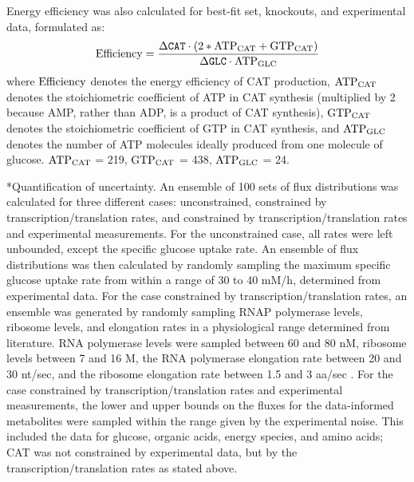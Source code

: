 \documentclass[12pt]{article}
\makeatletter
\renewcommand\subsubsection{\@startsection
	{subsubsection}{2}{0mm}
	{-0.05in}
	{-0.5\baselineskip}
	{\normalfont\normalsize\itshape}}
\makeatother
\begin{document}
Energy efficiency was also calculated for best-fit set, knockouts, and experimental data, formulated as:
\begin{equation}\label{eqn:energy-efficiency-definition}
	\rm Efficiency=\frac{\Delta\texttt{CAT}\cdot \left(2*\rm {ATP}_{CAT}+\rm {GTP}_{CAT}\right)}{\Delta\texttt{GLC}\cdot \rm {ATP}_{GLC}}
\end{equation}
where $\rm Efficiency$ denotes the energy efficiency of CAT production, $\rm {ATP}_{CAT}$ denotes the stoichiometric coefficient of ATP in CAT synthesis (multiplied by 2 because AMP, rather than ADP, is a product of CAT synthesis), $\rm {GTP}_{CAT}$ denotes the stoichiometric coefficient of GTP in CAT synthesis, and $\rm {ATP}_{GLC}$ denotes the number of ATP molecules ideally produced from one molecule of glucose.
$\rm {ATP}_{CAT}$ = 219, $\rm {GTP}_{CAT}$ = 438, $\rm {ATP}_{GLC}$ = 24.

\subsubsection*{Quantification of uncertainty.}
An ensemble of 100 sets of flux distributions was calculated for three different cases: unconstrained, constrained by transcription/translation rates, and constrained by transcription/translation rates and experimental measurements.
For the unconstrained case, all rates were left unbounded, except the specific glucose uptake rate.
An ensemble of flux distributions was then calculated by randomly sampling the maximum specific glucose uptake rate from within a range of 30 to 40 mM/h, determined from experimental data.
For the case constrained by transcription/translation rates, an ensemble was generated by randomly sampling RNAP polymerase levels, ribosome levels, and elongation rates in a physiological range determined from literature.
RNA polymerase levels were sampled between 60 and 80 nM, ribosome levels between 7 and 16 \textmu M, the RNA polymerase elongation rate between 20 and 30 nt/sec, and the ribosome elongation rate between 1.5 and 3 aa/sec \cite{2005_underwood_biotech, Garamella:2016aa}.
For the case constrained by transcription/translation rates and experimental measurements, the lower and upper bounds on the fluxes for the data-informed metabolites were sampled within the range given by the experimental noise.
This included the data for glucose, organic acids, energy species, and amino acids; CAT was not constrained by experimental data, but by the transcription/translation rates as stated above.
\end{document}
